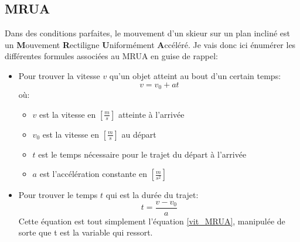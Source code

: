 \documentclass{article}
\begin{document}
\subsection{MRUA}
Dans des conditions parfaites, le mouvement d'un skieur sur un plan incliné est un \textbf{M}ouvement \textbf{R}ectiligne \textbf{U}niformément \textbf{A}ccéléré. Je vais donc ici énumérer les différentes formules associées au MRUA en guise de rappel:
\begin{itemize}
    \item Pour trouver la vitesse $v$ qu'un objet atteint au bout d'un certain temps:
        \begin{equation}
        \label{vit_MRUA}    
        v = v_0+at
        \end{equation}
    où:
    \begin{itemize}
            \item $v$ est la vitesse en $[\frac{m}{s}]$ atteinte à l'arrivée
            \item $v_0$ est la vitesse en $[\frac{m}{s}]$ au départ
            \item $t$ est le temps nécessaire pour le trajet du départ à l'arrivée
            \item $a$ est l'accélération constante en $[\frac{m}{s^2}]$
    \end{itemize}

    \vspace{0.4cm}

    \item Pour trouver le temps $t$ qui est la durée du trajet:
        \begin{equation}
        \label{tem_MRUA_short}    
        t=\frac{v-v_0}{a}
        \end{equation}
        Cette équation est tout simplement l'équation \ref{vit_MRUA}, manipulée de sorte que t est la variable qui ressort.
        \vspace{0.4cm}
    

\end{itemize}
\end{document}
